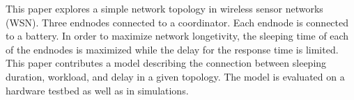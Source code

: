 This paper explores a simple network topology in wireless sensor networks (WSN). Three endnodes connected to a coordinator. Each endnode is connected to a battery. In order to maximize network longetivity, the sleeping time of each of the endnodes is maximized while the delay for the response time is limited. This paper contributes a model describing the connection between sleeping duration, workload, and delay in a given topology. The model is evaluated on a hardware testbed as well as in simulations.
